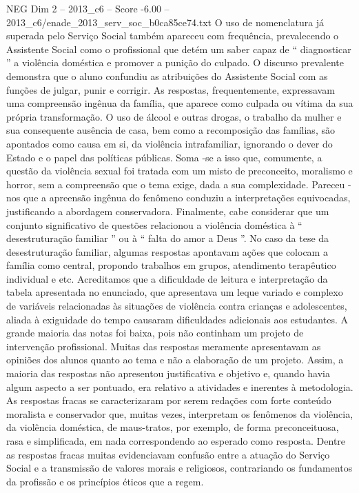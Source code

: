 \begin{textsample}{NEG Dim 2 – 2013\_c6 – Score -6.00 – 2013\_c6/enade\_2013\_serv\_soc\_b0ca85ce74.txt}
O uso de nomenclatura já superada pelo Serviço Social também apareceu com frequência, prevalecendo o Assistente Social como o profissional que detém um saber capaz de “ diagnosticar ” a violência doméstica e promover a punição do culpado.
O discurso prevalente demonstra que o aluno confundiu as atribuições do Assistente Social com as funções de julgar, punir e corrigir.
As respostas, frequentemente, expressavam uma compreensão ingênua da família, que aparece como culpada ou vítima da sua própria transformação.
O uso de álcool e outras drogas, o trabalho da mulher e sua consequente ausência de casa, bem como a recomposição das famílias, são apontados como causa em si, da violência intrafamiliar, ignorando o dever do Estado e o papel das políticas públicas.
Soma -se a isso que, comumente, a questão da violência sexual foi tratada com um misto de preconceito, moralismo e horror, sem a compreensão que o tema exige, dada a sua complexidade.
Pareceu -nos que a apreensão ingênua do fenômeno conduziu a interpretações equivocadas, justificando a abordagem conservadora.
Finalmente, cabe considerar que um conjunto significativo de questões relacionou a violência doméstica à “ desestruturação familiar ” ou à “ falta do amor a Deus ”.
No caso da tese da desestruturação familiar, algumas respostas apontavam ações que colocam a família como central, propondo trabalhos em grupos, atendimento terapêutico individual e etc.
Acreditamos que a dificuldade de leitura e interpretação da tabela apresentada no enunciado, que apresentava um leque variado e complexo de variáveis relacionadas às situações de violência contra crianças e adolescentes, aliada à exiguidade do tempo causaram dificuldades adicionais aos estudantes.
A grande maioria das notas foi baixa, pois não continham um projeto de intervenção profissional.
Muitas das respostas meramente apresentavam as opiniões dos alunos quanto ao tema e não a elaboração de um projeto.
Assim, a maioria das respostas não apresentou justificativa e objetivo e, quando havia algum aspecto a ser pontuado, era relativo a atividades e inerentes à metodologia.
As respostas fracas se caracterizaram por serem redações com forte conteúdo moralista e conservador que, muitas vezes, interpretam os fenômenos da violência, da violência doméstica, de maus-tratos, por exemplo, de forma preconceituosa, rasa e simplificada, em nada correspondendo ao esperado como resposta.
Dentre as respostas fracas muitas evidenciavam confusão entre a atuação do Serviço Social e a transmissão de valores morais e religiosos, contrariando os fundamentos da profissão e os princípios éticos que a regem.

\end{textsample}
